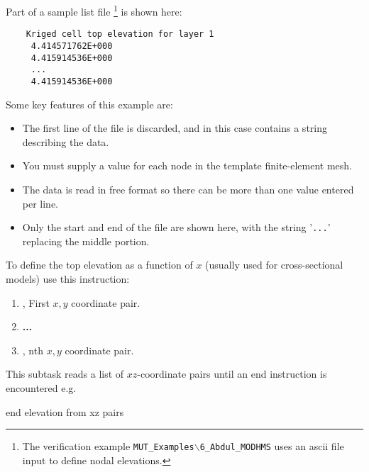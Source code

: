 Part of a sample list file \footnote{The verification example \texttt{MUT\_Examples$\backslash$6\_Abdul\_MODHMS} uses an ascii file input to define nodal elevations.} is shown here:
    \begin{verbatim}
    Kriged cell top elevation for layer 1
     4.414571762E+000
     4.415914536E+000
     ...
     4.415914536E+000
     \end{verbatim}
     \squish
Some key features of this example are:
\begin{itemize}
  \item The first line of the file is discarded, and in this case contains a string describing the data.
  \item You must supply a value for each node in the template finite-element mesh.
  \item The data is read in free format so there can be more than one value entered per line.
  \item Only the start and end of the file are shown here, with the string '\texttt{...}' replacing the middle portion.
\end{itemize}

To define the top elevation as a function of $x$ (usually used for cross-sectional models) use this instruction:

    {
    \squish
    \begin{enumerate}
    \item {},   First $x, y$ coordinate pair.
    \item \textbf{...}
    \item {},   nth $x, y$ coordinate pair.
    \end{enumerate}

     This subtask reads a list of $xz$-coordinate pairs until an \textsf{end} instruction is encountered e.g.\:

    {\Large \sf end elevation from xz pairs}
    }

